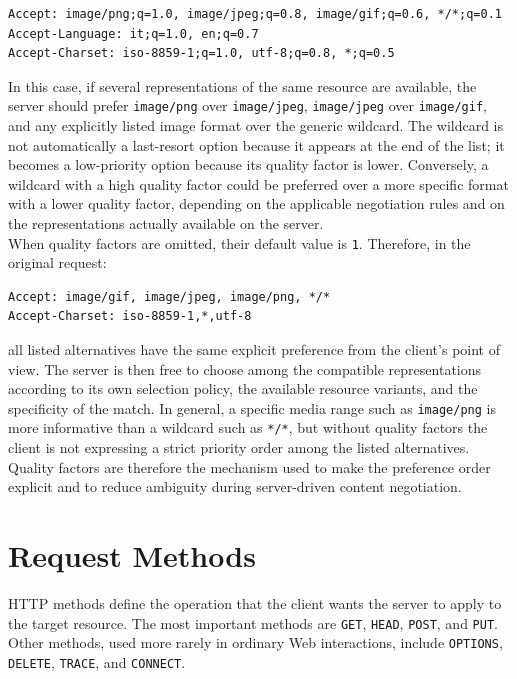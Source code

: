 \documentclass{scrbook}
\begin{document}
\begin{lstlisting}
Accept: image/png;q=1.0, image/jpeg;q=0.8, image/gif;q=0.6, */*;q=0.1
Accept-Language: it;q=1.0, en;q=0.7
Accept-Charset: iso-8859-1;q=1.0, utf-8;q=0.8, *;q=0.5
\end{lstlisting}

In this case, if several representations of the same resource are available, the server should prefer \texttt{image/png} over \texttt{image/jpeg}, \texttt{image/jpeg} over \texttt{image/gif}, and any explicitly listed image format over the generic wildcard. The wildcard is not automatically a last-resort option because it appears at the end of the list; it becomes a low-priority option because its quality factor is lower. Conversely, a wildcard with a high quality factor could be preferred over a more specific format with a lower quality factor, depending on the applicable negotiation rules and on the representations actually available on the server.\\

When quality factors are omitted, their default value is \texttt{1}. Therefore, in the original request:

\begin{lstlisting}
Accept: image/gif, image/jpeg, image/png, */*
Accept-Charset: iso-8859-1,*,utf-8
\end{lstlisting}

all listed alternatives have the same explicit preference from the client's point of view. The server is then free to choose among the compatible representations according to its own selection policy, the available resource variants, and the specificity of the match. In general, a specific media range such as \texttt{image/png} is more informative than a wildcard such as \texttt{*/*}, but without quality factors the client is not expressing a strict priority order among the listed alternatives. Quality factors are therefore the mechanism used to make the preference order explicit and to reduce ambiguity during server-driven content negotiation.

\section{Request Methods}

HTTP methods define the operation that the client wants the server to apply to the target resource. The most important methods are \texttt{GET}, \texttt{HEAD}, \texttt{POST}, and \texttt{PUT}. Other methods, used more rarely in ordinary Web interactions, include \texttt{OPTIONS}, \texttt{DELETE}, \texttt{TRACE}, and \texttt{CONNECT}.\\
\end{document}
